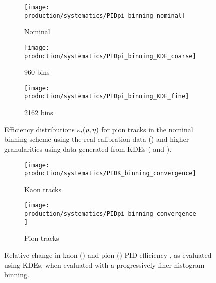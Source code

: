 \begin{figure}
  \begin{subfigure}{0.32\textwidth}
    \centering
    \texttt{[image: production/systematics/PIDpi\_binning\_nominal]}
    \caption{Nominal}
    \label{fig:prod:syst:pid:kde_2d_binning:pion:nominal}
  \end{subfigure}
  \begin{subfigure}{0.32\textwidth}
    \centering
    \texttt{[image: production/systematics/PIDpi\_binning\_KDE\_coarse]}
    \caption{960 bins}
    \label{fig:prod:syst:pid:kde_2d_binning:pion:coarse}
  \end{subfigure}
  \begin{subfigure}{0.32\textwidth}
    \centering
    \texttt{[image: production/systematics/PIDpi\_binning\_KDE\_fine]}
    \caption{2162 bins}
    \label{fig:prod:syst:pid:kde_2d_binning:pion:fine}
  \end{subfigure}

  \caption{%
    Efficiency distributions $\varepsilon_{i}(p,\eta)$ for pion tracks in the
    nominal binning scheme using the real calibration data
    () and higher
    granularities using data generated from \aclp{KDE}
    ( and
    ).
  }
  \label{fig:prod:syst:pid:kde_2d_binning:pion}
\end{figure}

\begin{figure}
  \begin{subfigure}{0.5\textwidth}
    \centering
    \texttt{[image: production/systematics/PIDK\_binning\_convergence]}
    \caption{Kaon tracks}
    \label{fig:prod:syst:pid:convergence:kaon}
  \end{subfigure}
  \begin{subfigure}{0.5\textwidth}
    \centering
    \texttt{[image: production/systematics/PIDpi\_binning\_convergence]}
    \caption{Pion tracks}
    \label{fig:prod:syst:pid:convergence:pion}
  \end{subfigure}
  \caption{%
    Relative change in kaon () and
    pion () \ac{PID} efficiency
    \effpid, as evaluated using \aclp{KDE}, when evaluated with a progressively
    finer histogram binning.
  }
  \label{fig:prod:syst:pid:convergence}
\end{figure}


